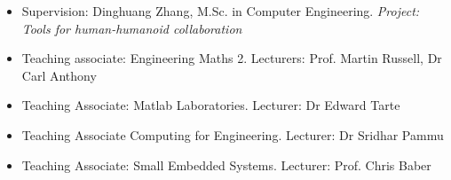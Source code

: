 \documentclass{mycv}
\begin{document}
\begin{itemize}
\item 	Supervision: Dinghuang Zhang, M.Sc. in Computer Engineering. 
	\textit{Project: Tools for human-humanoid collaboration}
\item Teaching associate: Engineering Maths 2. Lecturers: Prof. Martin Russell, Dr Carl Anthony 
\item Teaching Associate: Matlab Laboratories. Lecturer: Dr Edward Tarte  
\item Teaching Associate Computing for Engineering. Lecturer: Dr Sridhar Pammu  
\item Teaching Associate: Small Embedded Systems. Lecturer: Prof. Chris Baber   
\end{itemize}

%
\end{document}
